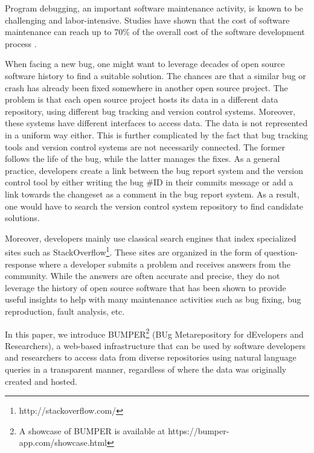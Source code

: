 \documentclass[conference]{IEEEtran}
\begin{document}
Program debugging, an important software maintenance activity, is known to be
challenging and labor-intensive. Studies have shown that the cost of software
maintenance can reach up to 70\% of the overall cost of the software development
 process \cite{Pressman2005}.

When facing a new bug, one might want to leverage decades of open source
software history to find a suitable solution.
The chances are that a similar bug or crash has already been fixed somewhere
in another open source project. The problem is that each open source
project hosts its data in a different data repository, using different
bug tracking and version control systems. Moreover, these systems have
different interfaces to access data.
The data is not represented in a uniform way either.
This is further complicated by the fact that bug tracking tools and version
control systems are not necessarily connected.
The former follows the life of the bug, while the latter manages the fixes.
As a general practice, developers create a link between the bug report system
and the version control tool by either writing the bug \#ID in their commits
message or add a link towards the changeset as a comment in the bug report
system. As a result, one would have to search the version control system
repository to find candidate solutions.

Moreover, developers mainly use classical search engines that index
specialized sites such as StackOverflow\footnote{http://stackoverflow.com/}.
These sites are organized in the form of question-response where a developer
submits a problem and receives answers from the community.
While the answers are often accurate and precise, they do not leverage the
history of open source software that has been shown to provide useful
insights to help with many maintenance activities such as bug
fixing\cite{Saha2014}, bug reproduction\cite{Nayrolles2015c},
fault analysis\cite{Nessa2008}, etc.

In this paper, we introduce BUMPER\footnote{A showcase of BUMPER is available
at https://bumper-app.com/showcase.html} (BUg Metarepository for dEvelopers
and Researchers), a web-based infrastructure that can be used by software
developers and researchers to access data from diverse repositories using
natural language queries in a transparent manner, regardless of where the
 data was originally created and hosted.
\end{document}
